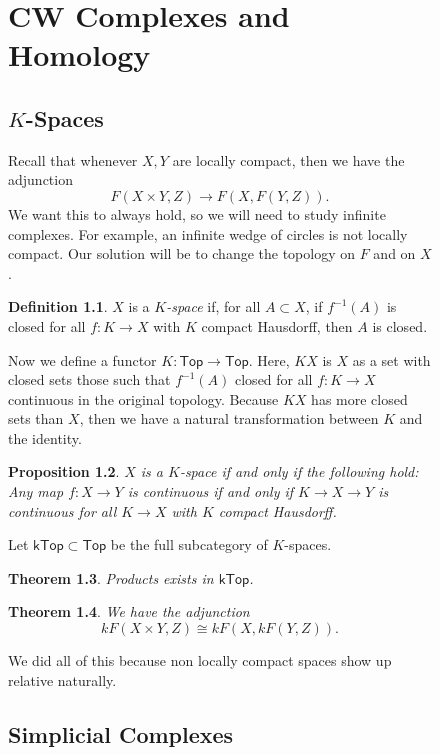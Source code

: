 \documentclass[leqno, openany]{memoir}
\newtheorem{thm}{Theorem}[section]
\newtheorem{prop}[thm]{Proposition}
\theoremstyle{definition}
\newtheorem{defn}[thm]{Definition}
\theoremstyle{remark}
\theoremstyle{plain}
\theoremstyle{definition}
\theoremstyle{remark}
\newcommand{\ms}[1]{\mathsf{#1}}
\begin{document}
\begin{figure}[H]
\chapter{CW Complexes and Homology}%

\section{$K$-Spaces}%

Recall that whenever $X,Y$ are locally compact, then we have the adjunction \[
F(X \times Y, Z) \to F(X, F(Y, Z)). \] We want this to always hold, so we will
need to study infinite complexes. For example, an infinite wedge of circles is
not locally compact. Our solution will be to change the topology on $F$ and on
$X$.

\begin{defn} $X$ is a \textit{$K$-space} if, for all $A \subset X$, if
$f^{-1}(A)$ is closed for all $f \colon K \to X$ with $K$ compact Hausdorff,
then $A$ is closed.  \end{defn}

Now we define a functor $K \colon \ms{Top} \to \ms{Top}$. Here, $KX$ is $X$ as
a set with closed sets those such that $f^{-1}(A)$ closed for all $f \colon K
\to X$ continuous in the original topology. Because $KX$ has more closed sets
than $X$, then we have a natural transformation between $K$ and the identity.

\begin{prop} $X$ is a $K$-space if and only if the following hold: Any map $f
\colon X \to Y$ is continuous if and only if $K \to X \to Y$ is continuous for
all $K \to X$ with $K$ compact Hausdorff.  \end{prop}

Let $\ms{kTop} \subset \ms{Top}$ be the full subcategory of $K$-spaces.

\begin{thm} Products exists in $\ms{kTop}$.  \end{thm}

\begin{thm} We have the adjunction \[ kF(X \times Y, Z) \cong kF(X, kF(Y, Z)).
\] \end{thm}

We did all of this because non locally compact spaces show up relative
naturally. 

\section{Simplicial Complexes}%


\end{figure}
\end{document}
